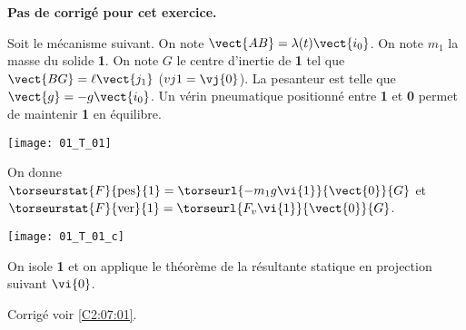 \normaltrue
\correctionfalse


\setcounter{numques}{0}
\ifcorrection
\else
\textbf{Pas de corrigé pour cet exercice.}
\fi

\ifprof
\else
Soit le mécanisme suivant. On note $\vect{AB}=\lambda(t)\vect{i_0}$. On note $m_1$ la masse du solide \textbf{1}.
On note $G$ le centre d'inertie de \textbf{1} tel que $\vect{BG}=\ell \vect{j_1}$ ($vj{1}=\vj{0}$). La pesanteur est telle que $\vect{g}=-g\vect{i_0}$. Un vérin pneumatique positionné entre \textbf{1} et \textbf{0} permet de maintenir \textbf{1} en équilibre. 
\begin{center}
\texttt{[image: 01\_T\_01]}
\end{center}
\fi

On donne 
$\torseurstat{F}{\text{pes}}{1}=\torseurl{-m_1g\vi{1}}{\vect{0}}{G}$ et 
$\torseurstat{F}{\text{ver}}{1}=\torseurl{F_v\vi{1}}{\vect{0}}{G}$.

\ifprof
\begin{center}
\texttt{[image: 01\_T\_01\_c]}
\end{center}
\else
\fi


On isole \textbf{1} et on applique le théorème de la résultante statique en projection suivant $\vi{0}$.

\ifprof
\else
\fi

\ifprof
\else
\fi



\ifprof
\else

\begin{flushright}
\footnotesize{Corrigé  voir \ref{C2:07:01}.}
\end{flushright}%
\fi


